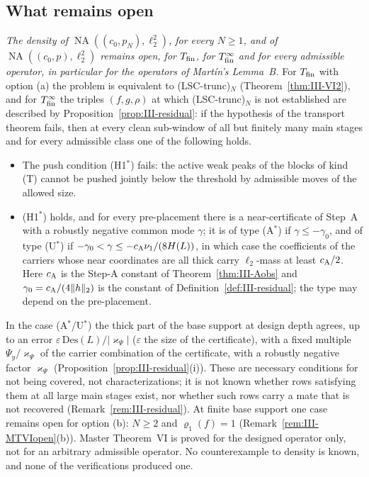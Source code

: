 \documentclass[10pt]{amsart}
\theoremstyle{definition}
\theoremstyle{remark}
\newcommand{\NA}{\operatorname{NA}}
\begin{document}
\subsection{What remains open}
\emph{The density of $\NA((c_0,p_N),\ell_2^2)$, for every $N\ge1$, and of
$\NA((c_0,p),\ell_2^2)$ remains open, for $T_{\rm fin}$, for
$T^\infty_{\rm fin}$ and for every admissible operator, in particular for
the operators of Mart\'in's Lemma~B.}  For
$T_{\rm fin}$ with option (a) the problem is equivalent to
(LSC-trunc)$_N$ (Theorem~\ref{thm:III-VI2}), and for $T^\infty_{\rm fin}$ the
triples $(f,g,\rho)$ at which (LSC-trunc)$_N$ is not established are
described by Proposition~\ref{prop:III-residual}: if the hypothesis of the
transport theorem fails, then at every clean sub-window of all but finitely
many main stages and for every admissible class one of the following holds.
\begin{itemize}
\item[(W$^*$)] The push condition (H1$^*$) fails: the active weak peaks of
the blocks of kind (T) cannot be pushed jointly below the threshold by
admissible moves of the allowed size.
\item[(A$^*$/U$^*$)] (H1$^*$) holds, and for every pre-placement there is a
near-certificate of Step~A with a robustly negative common mode $\gamma$;
it is of type (A$^*$) if $\gamma\le-\gamma_0$, and of type (U$^*$) if
$-\gamma_0<\gamma\le-c_{\rm A}\nu_1/(8H(L))$, in which case the
coefficients of the carriers whose near coordinates are all thick carry
$\ell_2$-mass at least $c_{\rm A}/2$.  Here $c_{\rm A}$ is the Step-A
constant of Theorem~\ref{thm:III-Aobs} and $\gamma_0=c_{\rm A}/(4\|h\|_2)$
is the constant of Definition~\ref{def:III-residual}; the type may depend
on the pre-placement.
\end{itemize}
In the case (A$^*$/U$^*$) the thick part of the base support at design
depth agrees, up to an error $\varepsilon\,\mathrm{Des}(L)/|\varkappa_\Psi|$
($\varepsilon$ the size of the certificate), with a fixed multiple
$\Psi_y/\varkappa_\Psi$ of the carrier combination of the certificate,
with a robustly negative factor $\varkappa_\Psi$
(Proposition~\ref{prop:III-residual}(i)).  These are necessary conditions for
not being covered, not characterizations; it is not known whether rows
satisfying them at all large main stages exist, nor whether such rows
carry a mate that is not recovered (Remark~\ref{rem:III-residual}).  At
finite base support one case remains open for option (b): $N\ge2$ and
$\varrho_1(f)=1$ (Remark~\ref{rem:III-MTVIopen}(b)).  Master Theorem~VI is
proved for the designed operator only, not for an arbitrary admissible
operator.  No counterexample to density is known, and none of the
verifications produced one.
\end{document}
